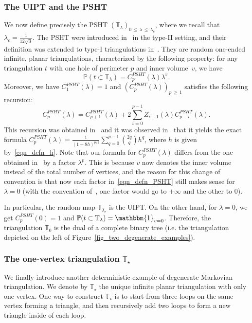 \documentclass[AHL,Unicode,longabstracts,published]{cedram}
\newcommand{\TT}{\mathbb{T}}
\renewcommand{\P}{\mathbb{P}}
\newcommand{\bbmun}{\mathbbm{1}}
\begin{document}
\subsubsection*{The UIPT and the PSHT}
We now define precisely the PSHT $(\TT_{\lambda})_{0\,\leq\,\lambda\,\leq\,\lambda_c}$, where we recall that $\lambda_c=\frac{1}{12\sqrt{3}}$. The PSHT were introduced in~\cite{CurPSHIT} in the type-II setting, and their definition was extended to type-I triangulations in~\cite{B16}. They are random one-ended infinite, planar triangulations, characterized by the following property: for any triangulation $t$ with one hole of perimeter $p$ and inner volume~$v$, we have
\begin{equation}\label{eqn_defn_PSHT}
\P \left(t \subset \TT_{\lambda} \right) = C_p^{PSHT}(\lambda) \lambda^{v}.
\end{equation}
Moreover, we have $C_1^{PSHT}(\lambda)=1$ and $(C_p^{PSHT}(\lambda))_{p\,\geq\,1}$ satisfies the following recursion:
\begin{equation}\label{eqn_Cp_psht}
C_p^{PSHT}(\lambda) = C_{p+1}^{PSHT}(\lambda) + 2 \sum_{i=0}^{p-1} Z_{i+1}(\lambda) C_{p-i}^{PSHT}(\lambda).
\end{equation}
This recursion was obtained in~\cite{CurPSHIT} and it was observed in~\cite{B16} that it yields the exact formula $C_p^{PSHT}(\lambda)=\frac{1}{(1+8h)^{p/2}} \sum_{q=0}^{p-1} \binom{2q}{q} h^q$, where $h$ is given by~\eqref{eqn_defn_h}. Note that our formula for $C_p^{PSHT}(\lambda)$ differs from the one obtained in~\cite{B16} by a factor $\lambda^p$. This is because $v$ now denotes the inner volume instead of the total number of vertices, and the reason for this change of convention is that now each factor in~\eqref{eqn_defn_PSHT} still makes sense for $\lambda=0$ (with the convention of~\cite{B16}, one factor would go to $+\infty$ and the other to $0$).

In particular, the random map $\TT_{\lambda_c}$ is the UIPT. On the other hand, for $\lambda=0$, we get $C_p^{PSHT}(0)=1$ and $\P (t \subset \TT_{\lambda} )=\bbmun_{v=0}$. Therefore, the triangulation $\TT_0$ is the dual of a complete binary tree (i.e. the triangulation depicted on the left of Figure~\ref{fig_two_degenerate_examples}).

\subsubsection*{The one-vertex triangulation $\TT_{\star}$}
We finally introduce another deterministic example of degenerate Markovian triangulation. We denote by $\TT_{\star}$ the unique infinite planar triangulation with only one vertex. One way to construct $\TT_{\star}$ is to start from three loops on the same vertex forming a triangle, and then recursively add two loops to form a new triangle inside of each loop.
\end{document}
